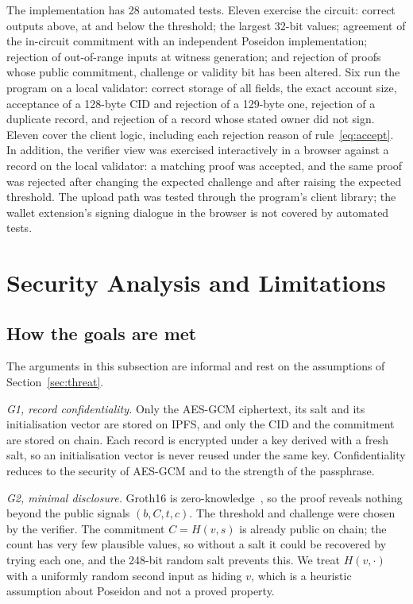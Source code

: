The implementation has 28 automated tests. Eleven exercise the circuit:
correct outputs above, at and below the threshold; the largest 32-bit
values; agreement of the in-circuit commitment with an independent Poseidon
implementation; rejection of out-of-range inputs at witness generation; and
rejection of proofs whose public commitment, challenge or validity bit has
been altered. Six run the program on a local validator: correct storage of
all fields, the exact account size, acceptance of a 128-byte CID and
rejection of a 129-byte one, rejection of a duplicate record, and rejection
of a record whose stated owner did not sign. Eleven cover the client logic,
including each rejection reason of rule~\eqref{eq:accept}. In addition, the
verifier view was exercised interactively in a browser against a record on
the local validator: a matching proof was accepted, and the same proof was rejected
after changing the expected challenge and after raising the expected
threshold. The upload path was tested through the program's client library;
the wallet extension's signing dialogue in the browser is not covered by
automated tests.

\section{Security Analysis and Limitations}\label{sec:security}

\subsection{How the goals are met}

The arguments in this subsection are informal and rest on the assumptions of
Section~\ref{sec:threat}.

\emph{G1, record confidentiality.} Only the AES-GCM ciphertext, its salt and
its initialisation vector are stored on IPFS, and only the CID and the
commitment are stored on chain. Each record is encrypted under a key derived
with a fresh salt, so an initialisation vector is never reused under the
same key. Confidentiality reduces to the security of AES-GCM and to the
strength of the passphrase.

\emph{G2, minimal disclosure.} Groth16 is zero-knowledge~\cite{groth2016},
so the proof reveals nothing beyond the public signals $(b, C, t, c)$. The
threshold and challenge were chosen by the verifier. The commitment
$C = H(v, s)$ is already public on chain; the count has very few plausible
values, so without a salt it could be recovered by trying each one, and the
248-bit random salt prevents this. We treat $H(v, \cdot)$ with a uniformly
random second input as hiding $v$, which is a heuristic assumption about
Poseidon and not a proved property.


